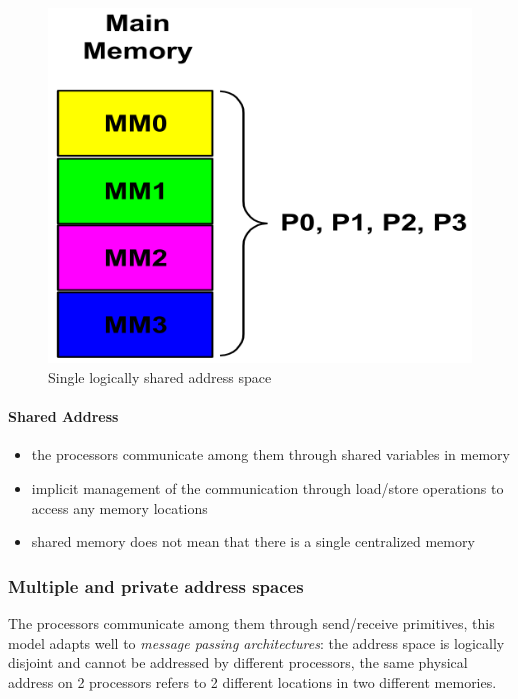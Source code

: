 \begin{figure}[h]
    \centering
    \includegraphics[scale = 0.3]{images/single-logically-shared-address-space}
    \caption{Single logically shared address space}
    \label{fig:single-logically-shared-address-space}
\end{figure}

\paragraph{Shared Address}
\begin{itemize}
    \item the processors communicate among them through shared variables in memory
    \item implicit management of the communication through load/store operations to access any memory locations
    \item shared memory does not mean that there is a single centralized memory
\end{itemize}

\subsubsection{Multiple and private address spaces}
The processors communicate among them through send/receive primitives, this model adapts well to \textit{message
passing architectures}: the address space is logically disjoint and cannot be addressed by different processors, the
same physical address on 2 processors refers to 2 different locations in two different memories.

